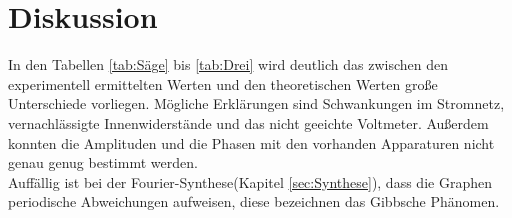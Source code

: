 \section{Diskussion}
\label{sec:Diskussion}

In den Tabellen \ref{tab:Säge} bis \ref{tab:Drei} wird deutlich das zwischen den experimentell ermittelten Werten und den theoretischen Werten große Unterschiede vorliegen. Mögliche Erklärungen sind Schwankungen im Stromnetz, vernachlässigte Innenwiderstände und das nicht geeichte Voltmeter. Außerdem konnten die Amplituden und die Phasen mit den vorhanden Apparaturen nicht genau genug bestimmt werden. \\
Auffällig ist bei der Fourier-Synthese(Kapitel \ref{sec:Synthese}), dass die Graphen periodische Abweichungen aufweisen, diese bezeichnen das Gibbsche Phänomen.
